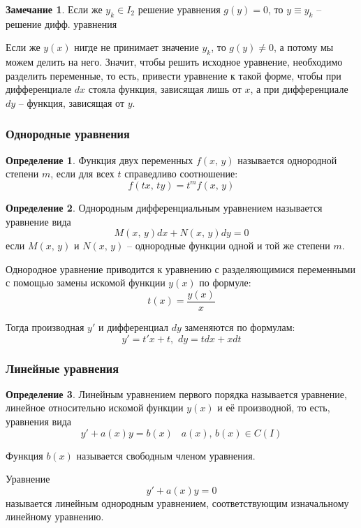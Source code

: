 \documentclass[a4paper,12pt]{article}
\theoremstyle{plain}
\theoremstyle{definition}
\newtheorem{definition}{Определение}[section]
\newtheorem*{note}{Замечание}
\theoremstyle{remark}
\begin{document}
\begin{note}
	Если же $y_k \in I_2$ решение уравнения $g(y) = 0$, то $y \equiv y_k$ -- решение дифф. уравнения
\end{note}

Если же $y(x)$ нигде не принимает значение $y_k$, то $g(y) \neq 0$, а потому мы можем делить на него. Значит, чтобы решить исходное уравнение, необходимо разделить переменные, то есть, привести уравнение к такой форме, чтобы при дифференциале $dx$ стояла функция, зависящая лишь от $x$, а при дифференциале $dy$ -- функция, зависящая от $y$.

\subsubsection*{Однородные уравнения}
\begin{definition}
	Функция двух переменных $f(x,\,y)$ называется однородной степени $m$, если для всех $t$ справедливо соотношение:
	\[f(tx,\,ty) = t^mf(x,\,y)\]
\end{definition}

\begin{definition}
	Однородным дифференциальным уравнением называется уравнение вида
	\[M(x,\,y)dx + N(x,\,y)dy = 0\]
	если $M(x,\,y)$ и $N(x,\,y)$ -- однородные функции одной и той же степени $m$.
\end{definition}

Однородное уравнение приводится к уравнению с разделяющимися переменными с помощью замены искомой функции $y(x)$ по формуле:
\[t(x) = \frac{y(x)}{x}\]

Тогда производная $y'$ и дифференциал $dy$ заменяются по формулам:
\[y' = t'x + t,\,\, dy = tdx + xdt\]

\subsubsection*{Линейные уравнения}
\begin{definition}
	Линейным уравнением первого порядка называется уравнение, линейное относительно искомой функции $y(x)$ и её производной, то есть, уравнения вида
	\[y' + a(x)y = b(x)\;\;\; a(x),\,b(x) \in C(I)\]

	Функция $b(x)$ называется свободным членом уравнения.

	Уравнение \[y' + a(x)y = 0\] называется линейным однородным уравнением, соответствующим изначальному линейному уравнению.
\end{definition}
\end{document}
